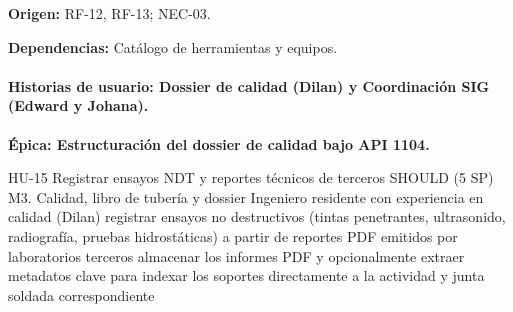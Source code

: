 \documentclass[12pt,letterpaper]{article}
\begin{document}
{\textbf{Origen:} RF-12, RF-13; NEC-03.\par
\textbf{Dependencias:} Catálogo de herramientas y equipos.}
\paragraph{Historias de usuario: Dossier de calidad (Dilan) y Coordinación SIG (Edward y Johana).}\mbox{}\par
\textbf{Épica: Estructuración del dossier de calidad bajo API 1104.}\par

\huFichaModelo
{HU-15}
{Registrar ensayos NDT y reportes técnicos de terceros}
{SHOULD (5 SP)}
{M3. Calidad, libro de tubería y dossier}
{Ingeniero residente con experiencia en calidad (Dilan)}
{registrar ensayos no destructivos (tintas penetrantes, ultrasonido, radiografía, pruebas hidrostáticas) a partir de reportes PDF emitidos por laboratorios terceros}
{almacenar los informes PDF y opcionalmente extraer metadatos clave para indexar los soportes directamente a la actividad y junta soldada correspondiente}
\end{document}
